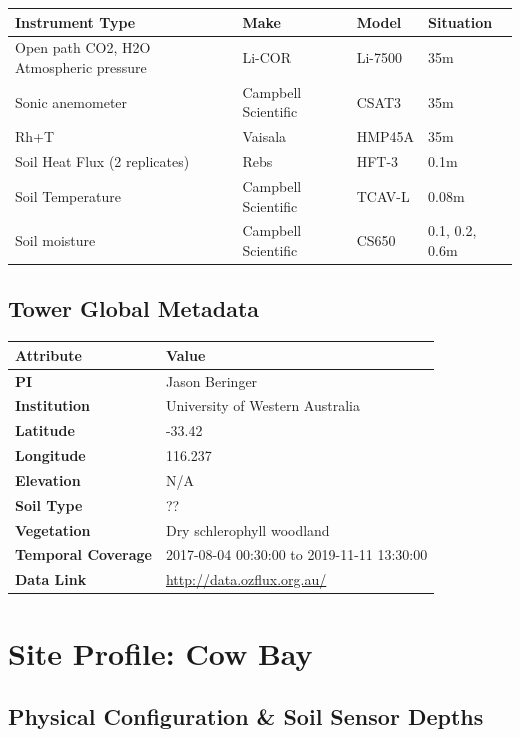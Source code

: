 \documentclass[11pt,a4paper]{article}
\begin{document}
\begin{longtable}{p{4.5cm}p{3.5cm}p{3.5cm}p{3.5cm}}
\toprule
\textbf{Instrument Type} & \textbf{Make} & \textbf{Model} & \textbf{Situation} \\
\midrule
\endhead
\bottomrule
\endfoot
Open path  CO2, H2O         Atmospheric pressure & Li-COR & Li-7500 & 35m \\
Sonic anemometer & Campbell Scientific & CSAT3 & 35m \\
Rh+T & Vaisala & HMP45A & 35m \\
Soil Heat Flux (2  replicates) & Rebs & HFT-3 & 0.1m \\
Soil Temperature & Campbell Scientific & TCAV-L & 0.08m \\
Soil moisture & Campbell Scientific & CS650 & 0.1, 0.2, 0.6m \\
\end{longtable}


\subsection*{Tower Global Metadata}

\begin{longtable}{p{4.5cm}p{10.5cm}}
\toprule
\textbf{Attribute} & \textbf{Value} \\
\midrule
\endhead
\bottomrule
\endfoot
\textbf{PI} & Jason Beringer \\
\textbf{Institution} & University of Western Australia \\
\textbf{Latitude} & -33.42 \\
\textbf{Longitude} & 116.237 \\
\textbf{Elevation} & N/A \\
\textbf{Soil Type} & ?? \\
\textbf{Vegetation} & Dry schlerophyll woodland \\
\textbf{Temporal Coverage} & 2017-08-04 00:30:00 to 2019-11-11 13:30:00 \\
\textbf{Data Link} & \url{http://data.ozflux.org.au/} \\
\end{longtable}

\newpage

\section{Site Profile: Cow Bay}

\subsection*{Physical Configuration \& Soil Sensor Depths}
\end{document}
